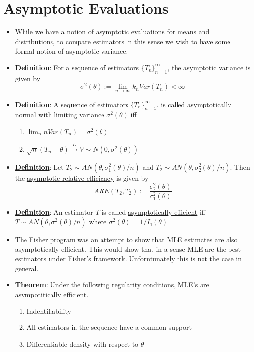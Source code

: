 \documentclass{article}
\begin{document}
\section{Asymptotic Evaluations}%
\begin{itemize}
\item While we have a notion of asymptotic evaluations for means and distributions, to compare estimators in this sense we wish to have some formal notion of asymptotic variance. 
\item \underline{\textbf{Definition}}: For a sequence of estimators $\{T_n\}_{n=1}^{\infty}$, the \underline{asymptotic variance} is given by $$\sigma^2(\theta) := \lim_{n\to\infty}k_nVar(T_n) <\infty$$
\item \underline{\textbf{Definition}}: A sequence of estimators $\{T_n\}_{n=1}^{\infty}$, is called \underline{asymptotically normal with limiting variance $\sigma^2(\theta)$} iff 
\begin{enumerate}
	\item $\lim_{n}nVar(T_n) = \sigma^2(\theta)$
	\item $\sqrt{n}(T_n - \theta)\overset{D}{\longrightarrow} V\sim N(0,\sigma^2(\theta))$
\end{enumerate}
\item \underline{\textbf{Definition}}: Let $T_2\sim AN(\theta, \sigma^2_1(\theta)/n)$ and $T_2\sim AN(\theta, \sigma^2_2(\theta)/n)$. Then the \underline{asymptotic relative efficiency} is given by $$ARE(T_2, T_2):= \frac{\sigma^2_2(\theta)}{\sigma^2_1(\theta)}$$
\item \underline{\textbf{Definition}}: An estimator $T$ is called \underline{asymptotically efficient} iff $T\sim AN(\theta, \sigma^2(\theta)/n)$ where $\sigma^2(\theta) = 1/I_1(\theta)$
\item The Fisher program was an attempt to show that MLE estimates are also asymptotically efficient. This would show that in a sense MLE are the best estimators under Fisher's framework. Unforntunately this is not the case in general. 
\item \underline{\textbf{Theorem}}: Under the following regularity conditions, MLE's are asympotitically efficient. 
\begin{enumerate}
\item Indentifiability 
\item All estimators in the sequence have a common support
\item Differentiable density with respect to $\theta$

\end{enumerate}
\end{itemize}
\end{document}
